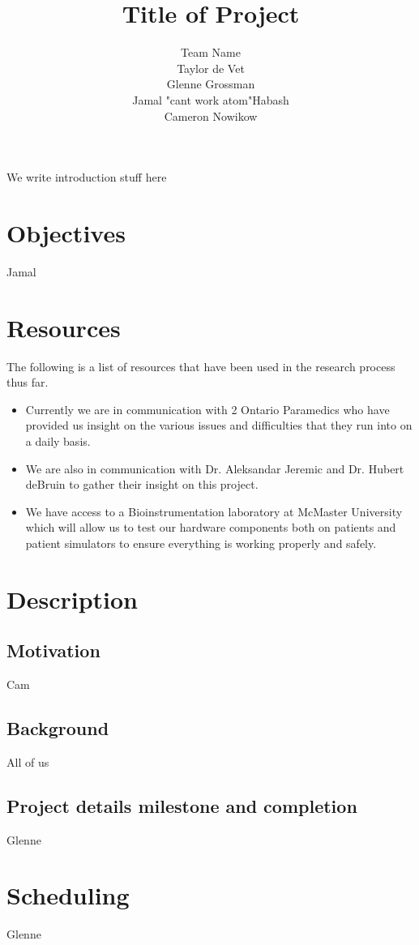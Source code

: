 \documentclass{article}
\title{Title of Project}
\author{Team Name
		\\ Taylor de Vet
    \\ Glenne Grossman
		\\ Jamal "cant work atom"Habash
		\\ Cameron Nowikow
}
\date{}
\begin{document}
\newpage

\maketitle

We write introduction stuff here

\section{Objectives}
Jamal

\section{Resources}
The following is a list of resources that have been used in the research process thus far.
\begin{itemize}
\item Currently we are in communication with 2 Ontario Paramedics who have provided us insight on the various issues and difficulties that they run into on a daily basis.
\item We are also in communication with Dr. Aleksandar Jeremic and Dr. Hubert deBruin to gather their insight on this project. 
\item We have access to a Bioinstrumentation laboratory at McMaster University which will allow us to test our hardware components both on patients and patient simulators to ensure everything is working properly and safely. 
\end{itemize}



\section{Description}

\subsection{Motivation}
Cam
\subsection{Background}
All of us
\subsection{Project details milestone and completion}
Glenne
\section{Scheduling}
Glenne
\end{document}
